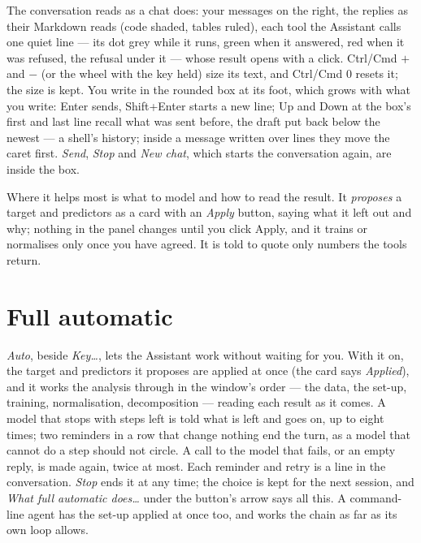 \documentclass[11pt]{report}
\begin{document}
The conversation reads as a chat does: your messages on the right, the replies as their
Markdown reads (code shaded, tables ruled), each tool the Assistant calls one quiet line
--- its dot grey while it runs, green when it answered, red when it was refused, the
refusal under it --- whose result opens with a click. Ctrl/Cmd $+$ and $-$ (or the wheel
with the key held) size its text, and Ctrl/Cmd 0 resets it; the size is kept. You write
in the rounded box at its foot, which grows with what you write: Enter sends, Shift+Enter
starts a new line; Up and Down at the box's first and last line recall what was sent
before, the draft put back below the newest --- a shell's history; inside a message
written over lines they move the caret first. \emph{Send}, \emph{Stop} and \emph{New
chat}, which starts the conversation again, are inside the box.

Where it helps most is what to model and how to read the result. It \emph{proposes} a
target and predictors as a card with an \emph{Apply} button, saying what it left out and
why; nothing in the panel changes until you click Apply, and it trains or normalises only
once you have agreed. It is told to quote only numbers the tools return.

\section{Full automatic}\label{sec:autoassistant}
\emph{Auto}, beside \emph{Key\ldots}, lets the Assistant work without waiting for you.
With it on, the target and predictors it proposes are applied at once (the
card says \emph{Applied}), and it works the analysis through in the window's order ---
the data, the set-up, training, normalisation, decomposition --- reading each result as it
comes. A model that stops with steps left is told what is left and goes on, up to eight
times; two reminders in a row that change nothing end the turn, as a model that cannot do
a step should not circle. A call to the model that fails, or an empty reply, is made again,
twice at most. Each reminder and retry is a line in the conversation. \emph{Stop} ends it
at any time; the choice is kept for the next session, and \emph{What full automatic
does\ldots} under the button's arrow says all this. A command-line agent has the set-up
applied at once too, and works the chain as far as its own loop allows.
\end{document}
